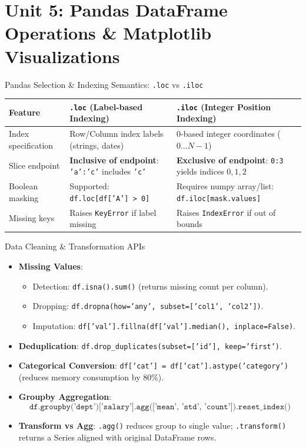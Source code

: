 \chapter{Unit 5: Pandas DataFrame Operations \& Matplotlib Visualizations}

\begin{formulabox}{Pandas Selection \& Indexing Semantics: \texttt{.loc} vs \texttt{.iloc}}
\begin{center}
\begin{tabularx}{0.96\textwidth}{l X X}
\toprule
\textbf{Feature} & \textbf{\texttt{.loc} (Label-based Indexing)} & \textbf{\texttt{.iloc} (Integer Position Indexing)} \\
\midrule
Index specification & Row/Column index labels (strings, dates) & 0-based integer coordinates ($0 \dots N-1$) \\
Slice endpoint & \textbf{Inclusive of endpoint}: \texttt{'a':'c'} includes \texttt{'c'} & \textbf{Exclusive of endpoint}: \texttt{0:3} yields indices $0, 1, 2$ \\
Boolean masking & Supported: \texttt{df.loc[df['A'] > 0]} & Requires numpy array/list: \texttt{df.iloc[mask.values]} \\
Missing keys & Raises \texttt{KeyError} if label missing & Raises \texttt{IndexError} if out of bounds \\
\bottomrule
\end{tabularx}
\end{center}
\end{formulabox}

\begin{formulabox}{Data Cleaning \& Transformation APIs}
\begin{itemize}[leftmargin=1.5em, itemsep=2pt]
    \item \textbf{Missing Values}:
    \begin{itemize}
        \item Detection: \texttt{df.isna().sum()} (returns missing count per column).
        \item Dropping: \texttt{df.dropna(how='any', subset=['col1', 'col2'])}.
        \item Imputation: \texttt{df['val'].fillna(df['val'].median(), inplace=False)}.
    \end{itemize}
    \item \textbf{Deduplication}: \texttt{df.drop\_duplicates(subset=['id'], keep='first')}.
    \item \textbf{Categorical Conversion}: \texttt{df['cat'] = df['cat'].astype('category')} (reduces memory consumption by $80\%$).
    \item \textbf{Groupby Aggregation}:
    \begin{equation*}
    \texttt{df.groupby('dept')['salary'].agg(['mean', 'std', 'count']).reset\_index()}
    \end{equation*}
    \item \textbf{Transform vs Agg}: \texttt{.agg()} reduces group to single value; \texttt{.transform()} returns a Series aligned with original DataFrame rows.
\end{itemize}
\end{formulabox}

